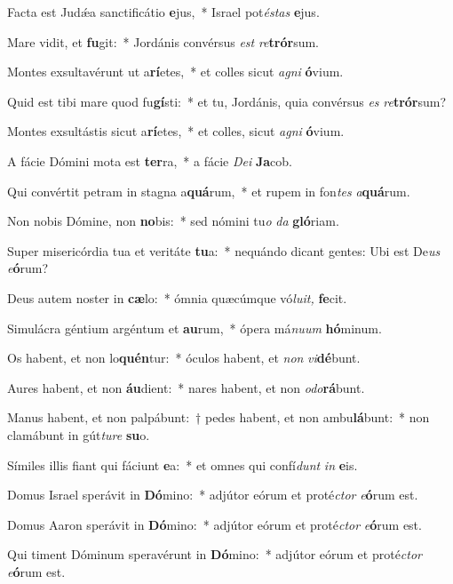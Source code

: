 \item Facta est Judǽa sanctificátio \textbf{e}jus,~* Israel pot\textit{éstas} \textbf{e}jus.
\item Mare vidit, et \textbf{fu}git:~* Jordánis convérsus \textit{est} \textit{re}\textbf{trór}sum.
\item Montes exsultavérunt ut a\textbf{rí}etes,~* et colles sicut \textit{agni} \textbf{ó}vium.
\item Quid est tibi mare quod fu\textbf{gí}sti:~* et tu, Jordánis, quia convérsus \textit{es} \textit{re}\textbf{trór}sum?
\item Montes exsultástis sicut a\textbf{rí}etes,~* et colles, sicut \textit{agni} \textbf{ó}vium.
\item A fácie Dómini mota est \textbf{ter}ra,~* a fácie \textit{Dei} \textbf{Ja}cob.
\item Qui convértit petram in stagna a\textbf{quá}rum,~* et rupem in fon\textit{tes} \textit{a}\textbf{quá}rum.
\item Non nobis Dómine, non \textbf{no}bis:~* sed nómini tu\textit{o} \textit{da} \textbf{gló}riam.
\item Super misericórdia tua et veritáte \textbf{tu}a:~* nequándo dicant gentes: Ubi est De\hspace*{0.02em}\textit{us} \textit{e}\textbf{ó}rum?
\item Deus autem noster in \textbf{cæ}lo:~* ómnia quæcúmque vó\textit{luit,} \textbf{fe}cit.
\item Simulácra géntium argéntum et \textbf{au}rum,~* ópera má\textit{nuum} \textbf{hó}minum.
\item Os habent, et non lo\textbf{quén}tur:~* óculos habent, et \textit{non} \textit{vi}\textbf{dé}bunt.
\item Aures habent, et non \textbf{áu}dient:~* nares habent, et non \textit{odo}\textbf{rá}bunt.
\item Manus habent, et non palpábunt:~† pedes habent, et non ambu\textbf{lá}bunt:~* non clamábunt in gút\textit{ture} \textbf{su}o.
\item Símiles illis fiant qui fáciunt \textbf{e}a:~* et omnes qui confí\hspace*{0.02em}\textit{dunt} \textit{in} \textbf{e}is.
\item Domus Israel sperávit in \textbf{Dó}mino:~* adjútor eórum et proté\textit{ctor} \textit{e}\textbf{ó}rum est.
\item Domus Aaron sperávit in \textbf{Dó}mino:~* adjútor eórum et proté\textit{ctor} \textit{e}\textbf{ó}rum est.
\item Qui timent Dóminum speravérunt in \textbf{Dó}mino:~* adjútor eórum et proté\textit{ctor} \textit{e}\textbf{ó}rum est.

